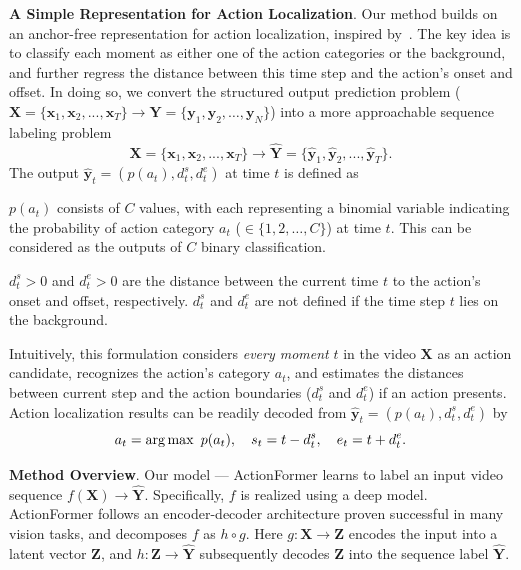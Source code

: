 \smallskip
\noindent \textbf{A Simple Representation for Action Localization}. Our method builds on an anchor-free representation for action localization, inspired by~\cite{a2nettip2020,afsdcvpr2021}. The key idea is to classify each moment as either one of the action categories or the background, and further regress the distance between this time step and the action's onset and offset. In doing so, we convert the structured output prediction problem ($\mathbf{X}=\{\mathbf{x}_1, \mathbf{x}_2, ..., \mathbf{x}_T\} \rightarrow \mathbf{Y} = \{\mathbf{y}_1, \mathbf{y}_2, \ldots, \mathbf{y}_N\}$) into a more approachable sequence labeling problem
\begin{equation}
\mathbf{X}=\{\mathbf{x}_1, \mathbf{x}_2, ..., \mathbf{x}_T\} \rightarrow \mathbf{\hat{Y}}=\{\mathbf{\hat{y}}_1, \mathbf{\hat{y}}_2, ..., \mathbf{\hat{y}}_T\}.
\end{equation}
The output $\mathbf{\hat{y}}_t=(p(a_t), d_t^s, d_t^e)$ at time $t$ is defined as 
\squishlist
\item $p(a_t)$ consists of $C$ values, with each representing a binomial variable indicating the probability of action category $a_t$ ($\in \{1, 2, \ldots, C\}$) at time $t$. This can be considered as the outputs of $C$ binary classification. 
\item $d_t^s>0$ and $d_t^e>0$ are the distance between the current time $t$ to the action's onset and offset, respectively. $d_t^s$ and $d_t^e$ are not defined if the time step $t$ lies on the background. 
\squishend

\smallskip
Intuitively, this formulation considers \emph{every moment} $t$ in the video $\mathbf{X}$ as an action candidate, recognizes the action's category $a_t$, and estimates the distances between current step and the action boundaries ($d_t^s$ and $d_t^e$) if an action presents. Action localization results can be readily decoded from $\mathbf{\hat{y}}_t=(p(a_t), d_t^s, d_t^e)$ by
\begin{equation}
    a_t = \operatorname*{arg\,max} \ p(a_t), \quad s_t = t-d_t^s, \quad e_t=t+d_t^e.
\end{equation}%

\noindent \textbf{Method Overview}. Our model --- ActionFormer learns to label an input video sequence $f(\mathbf{X}) \rightarrow \mathbf{\hat{Y}}$. Specifically, $f$ is realized using a deep model. ActionFormer follows an encoder-decoder architecture proven successful in many vision tasks, and decomposes $f$ as $h\circ g$. Here $g\colon \mathbf{X} \rightarrow \mathbf{Z}$ encodes the input into a latent vector $\mathbf{Z}$, and $h\colon \mathbf{Z} \rightarrow \mathbf{\hat{Y}}$ subsequently decodes $\mathbf{Z}$ into the sequence label $\mathbf{\hat{Y}}$.

